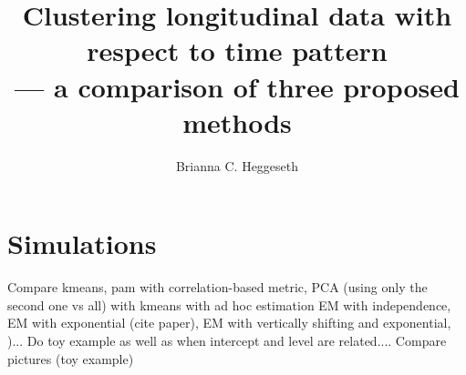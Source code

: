 \documentclass[11pt]{article}
\title{Clustering longitudinal data with respect to time pattern\\--- a comparison of three proposed methods}
\author{Brianna C. Heggeseth}
\begin{document}
\doublespace
\maketitle
\section{Simulations}
Compare kmeans, pam with correlation-based metric, PCA (using only the second one vs all) with kmeans with ad hoc estimation
EM with independence, EM with exponential (cite paper), EM with vertically shifting and exponential, )...
Do toy example as well as when intercept and level are related....
Compare pictures (toy example)
\end{document}
